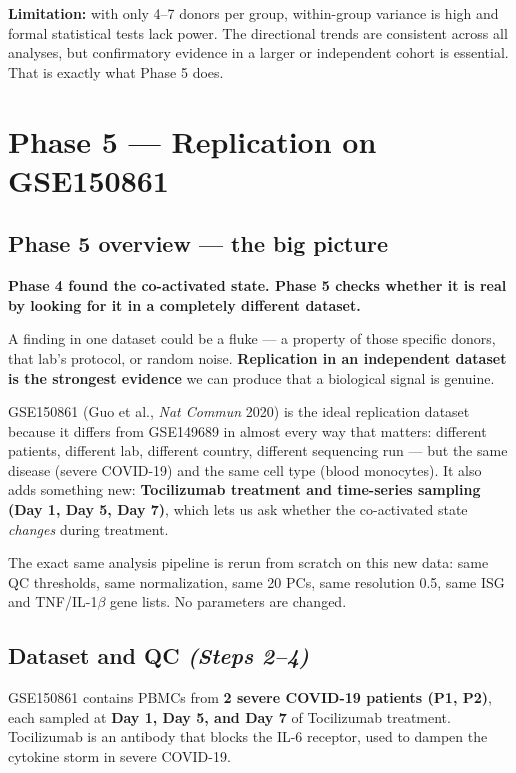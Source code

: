 \documentclass[11pt, a4paper]{article}
\begin{document}
\textbf{Limitation:} with only 4--7 donors per group, within-group variance is high 
and formal statistical tests lack power. The directional trends are consistent
across all analyses, but confirmatory evidence in a larger or independent cohort
is essential. That is exactly what Phase 5 does.

\section{Phase 5 — Replication on GSE150861}

\subsection{Phase 5 overview — the big picture}

\textbf{Phase 4 found the co-activated state. Phase 5 checks whether it is real
by looking for it in a completely different dataset.}

A finding in one dataset could be a fluke — a property of those specific donors,
that lab's protocol, or random noise. \textbf{Replication in an independent
dataset is the strongest evidence} we can produce that a biological signal
is genuine.

GSE150861 (Guo et al., \textit{Nat Commun} 2020) is the ideal replication
dataset because it differs from GSE149689 in almost every way that matters:
different patients, different lab, different country, different sequencing run —
but the same disease (severe COVID-19) and the same cell type (blood monocytes).
It also adds something new: \textbf{Tocilizumab treatment and time-series sampling
(Day 1, Day 5, Day 7)}, which lets us ask whether the co-activated state
\textit{changes} during treatment.

The exact same analysis pipeline is rerun from scratch on this new data:
same QC thresholds, same normalization, same 20 PCs, same resolution 0.5,
same ISG and TNF/IL-1$\beta$ gene lists. No parameters are changed.

\subsection{Dataset and QC \small\normalfont\textit{(Steps 2–4)}}

GSE150861 contains PBMCs from \textbf{2 severe COVID-19 patients (P1, P2)},
each sampled at \textbf{Day 1, Day 5, and Day 7} of Tocilizumab treatment.
Tocilizumab is an antibody that blocks the IL-6 receptor, used to dampen
the cytokine storm in severe COVID-19.
\end{document}
